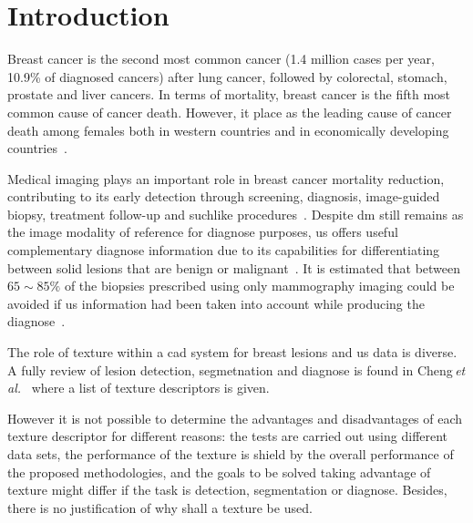 \documentclass[a4paper, 10pt, conference]{llncs}      %
\begin{document}
\graphicspath{{figures/}}

\section{Introduction}
\label{sec:introduction}
 
Breast cancer is the second most common cancer (1.4 million cases per year, 10.9\% of  diagnosed cancers) after lung cancer, followed by colorectal, stomach, prostate and liver cancers. 
In terms of mortality, breast cancer is the fifth most common cause of cancer death. However, it place as the leading cause of cancer death among females both in western countries and in economically developing countries~\cite{cancerStatistics2011}.

Medical imaging plays an important role in breast cancer mortality reduction, contributing to its early detection through screening, diagnosis, image-guided biopsy, treatment follow-up and suchlike procedures~\cite{smith2003american}.
Despite \ac{dm} still remains as the image modality of reference for diagnose purposes, \ac{us} offers useful complementary  diagnose information due to its capabilities for differentiating between solid lesions that are benign or malignant~\cite{stavros2004breast}. It is estimated that between $65\sim85\%$ of the biopsies prescribed using only mammography imaging could be avoided if \ac{us} information had been taken into account while producing the diagnose~\cite{yuan2010multimodality}. 


The role of texture within a \ac{cad} system for breast lesions and \ac{us} data is diverse. 
A fully review of lesion detection, segmetnation and diagnose is found in Cheng\,\emph{et al.}~\cite{Cheng:2009p10580} where a list of texture descriptors is given.

However it is not possible to determine the advantages and disadvantages of each texture descriptor for different reasons: the tests are carried out using different data sets, the performance of the texture is shield by the overall performance of the proposed methodologies, and the goals to be solved taking advantage of texture might differ if the task is detection, segmentation or diagnose. Besides,  there is no justification of why shall a texture be used. 
\end{document}
